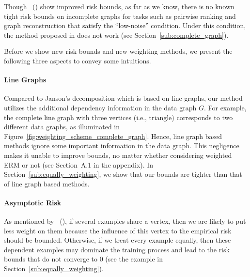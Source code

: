 \documentclass[letterpaper]{article} %
\newcommand{\problemabbr}{\textnormal{C}\textsc{lanet}}
\newcommand{\citet}[1]{\citeauthor{#1}\ (\citeyear{#1})}
\newcommand{\citep}[3]{(#1\ \citeauthor{#3}\ \citeyear{#3},\ #2)}
\begin{document}
Though \citet{wang2017learning} show improved risk bounds, as far as we know, there is no known tight risk bounds on incomplete graphs for tasks such as pairwise ranking and graph reconstruction that satisfy the ``low-noise'' condition. Under this condition, the method proposed in \cite{wang2017learning} does not work (see Section~\ref{sub:complete_graph}). 



Before we show new risk bounds and new weighting methods, we present the following three aspects to convey some intuitions. 

\paragraph{Line Graphs} 
Compared to Janson's decomposition which is based on line graphs, our method utilizes the additional dependency information in the data graph $G$. 
For example, the complete line graph with three vertices (i.e., triangle) corresponds to two different data graphs, as illuminated in Figure~\ref{fig:weighting_scheme_complete_graph}. 
Hence, line graph based methods ignore some important information in the data graph. 
This negligence makes it unable to improve bounds, no matter whether considering weighted ERM or not (see Section~A.1 in the appendix). 
In Section~\ref{sub:equally_weighting}, we show that our bounds are tighter than that of line graph based methods. 

\paragraph{Asymptotic Risk}
As mentioned by \citet{wang2017learning}, if several examples share a vertex, then we are likely to put less weight on them because the influence of this vertex to the empirical risk should be bounded. 
Otherwise, if we treat every example equally, then these dependent examples may dominate the training process and lead to the risk bounds that do not converge to $0$ (see the example in Section~\ref{sub:equally_weighting}).
\end{document}

